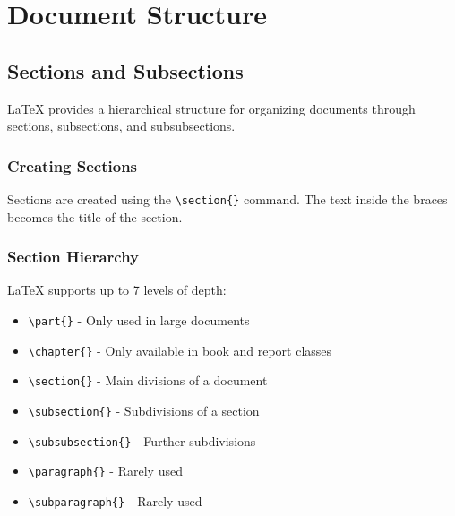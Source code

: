 \section{Document Structure}\label{sec:document-structure}

\subsection{Sections and Subsections}\label{subsec:sections-subsections}
LaTeX provides a hierarchical structure for organizing documents through sections, subsections, and subsubsections.

\subsubsection{Creating Sections}\label{subsubsec:creating-sections}
Sections are created using the \verb|\section{}| command.
The text inside the braces becomes the title of the section.

\subsubsection{Section Hierarchy}\label{subsubsec:section-hierarchy}
LaTeX supports up to 7 levels of depth:
\begin{itemize}
    \item \verb|\part{}| - Only used in large documents
    \item \verb|\chapter{}| - Only available in book and report classes
    \item \verb|\section{}| - Main divisions of a document
    \item \verb|\subsection{}| - Subdivisions of a section
    \item \verb|\subsubsection{}| - Further subdivisions
    \item \verb|\paragraph{}| - Rarely used
    \item \verb|\subparagraph{}| - Rarely used
\end{itemize}

